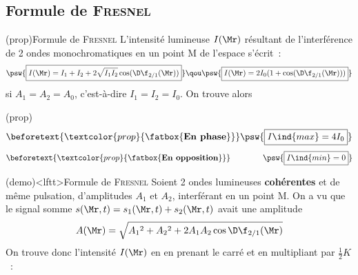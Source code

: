 \documentclass[../../main/main.tex]{subfiles}
\begin{document}
\subsection{Formule de \textsc{Fresnel}}
\begin{tcb}[breakable](prop){Formule de \textsc{Fresnel}}
	L'intensité lumineuse $I(\Mr)$ résultant de l'interférence de 2 ondes
	monochromatiques en un point M de l'espace s'écrit~:
	\[
		\psw{%
			\boxed{I(\Mr) = I_1 + I_2 + 2\sqrt{I_1I_2}\cos (\D\f_{2/1}(\Mr))}
		}
		\qou
		\psw{%
			\boxed{I(\Mr) = 2I_0(1+\cos (\D\f_{2/1}(\Mr)))}
		}
	\]
	si $A_1 = A_2 = A_0$, c'est-à-dire $I_1 = I_2 = I_0$. On trouve alors
	\smallbreak
	\begin{isd}(prop)
		\vspace{-15pt}
		\begin{gather*}
			\beforetext{\textcolor{prop}{\fatbox{\textbf{En phase}}}}
			\psw{\boxed{I\ind{max} = 4I_0}}
		\end{gather*}
		\tcblower
		\vspace{-15pt}
		\begin{gather*}
			\beforetext{\textcolor{prop}{\fatbox{\textbf{En opposition}}}}
			\hspace{40pt}
			\psw{\boxed{I\ind{min} = 0}}
		\end{gather*}
	\end{isd}
\end{tcb}

\begin{tcb}(demo)<lftt>{Formule de \textsc{Fresnel}}
	Soient 2 ondes lumineuses \textbf{cohérentes} et de même pulsation,
	d'amplitudes $A_1$ et $A_2$, interférant en un point M. On a vu que le signal
	somme $s(\Mr,t) = s_1(\Mr,t) + s_2(\Mr,t)$ avait une amplitude
	\[A(\Mr) = \sqrt{A_1{}^2 + A_2{}^2 + 2A_1A_2\cos\D\f_{2/1}(\Mr)}\]
	On trouve donc l'intensité $I(\Mr)$ en en prenant le carré et en multipliant par
	$\frac{1}{2}K$~:
	\vspace{-15pt}
\end{tcb}
\end{document}
